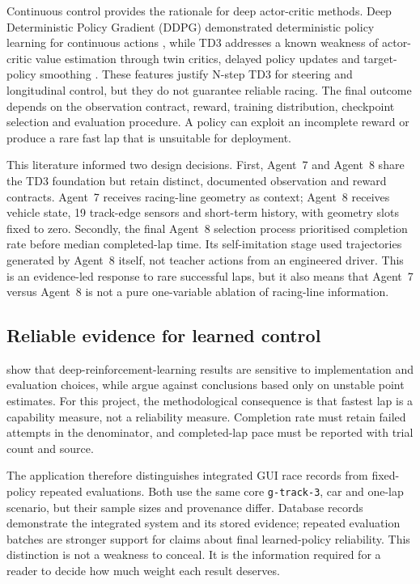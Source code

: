 Continuous control provides the rationale for deep actor-critic methods. Deep Deterministic Policy Gradient (DDPG) demonstrated deterministic policy learning for continuous actions \parencite{lillicrap2016}, while TD3 addresses a known weakness of actor-critic value estimation through twin critics, delayed policy updates and target-policy smoothing \parencite{fujimoto2018}. These features justify N-step TD3 for steering and longitudinal control, but they do not guarantee reliable racing. The final outcome depends on the observation contract, reward, training distribution, checkpoint selection and evaluation procedure. A policy can exploit an incomplete reward or produce a rare fast lap that is unsuitable for deployment.

This literature informed two design decisions. First, Agent~7 and Agent~8 share the TD3 foundation but retain distinct, documented observation and reward contracts. Agent~7 receives racing-line geometry as context; Agent~8 receives vehicle state, 19 track-edge sensors and short-term history, with geometry slots fixed to zero. Secondly, the final Agent~8 selection process prioritised completion rate before median completed-lap time. Its self-imitation stage used trajectories generated by Agent~8 itself, not teacher actions from an engineered driver. This is an evidence-led response to rare successful laps, but it also means that Agent~7 versus Agent~8 is not a pure one-variable ablation of racing-line information.

\subsection{Reliable evidence for learned control}

\textcite{henderson2018} show that deep-reinforcement-learning results are sensitive to implementation and evaluation choices, while \textcite{agarwal2021} argue against conclusions based only on unstable point estimates. For this project, the methodological consequence is that fastest lap is a capability measure, not a reliability measure. Completion rate must retain failed attempts in the denominator, and completed-lap pace must be reported with trial count and source.

The application therefore distinguishes integrated GUI race records from fixed-policy repeated evaluations. Both use the same core \texttt{g-track-3}, car and one-lap scenario, but their sample sizes and provenance differ. Database records demonstrate the integrated system and its stored evidence; repeated evaluation batches are stronger support for claims about final learned-policy reliability. This distinction is not a weakness to conceal. It is the information required for a reader to decide how much weight each result deserves.

